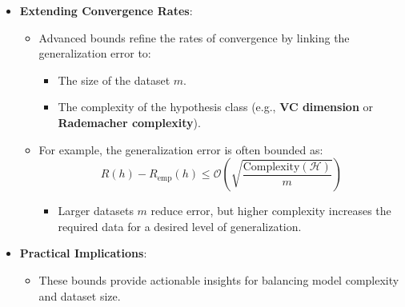 \documentclass[
  ignorenonframetext,
]{beamer}
\providecommand{\tightlist}{%
  \setlength{\itemsep}{0pt}\setlength{\parskip}{0pt}}\usepackage{longtable,booktabs,array}
\begin{document}
\begin{frame}
\begin{itemize}
\tightlist
\item
  \textbf{Extending Convergence Rates}:

  \begin{itemize}
  \tightlist
  \item
    Advanced bounds refine the rates of convergence by linking the
    generalization error to:

    \begin{itemize}
    \tightlist
    \item
      The size of the dataset \(m\).
    \item
      The complexity of the hypothesis class (e.g., \textbf{VC
      dimension} or \textbf{Rademacher complexity}).
    \end{itemize}
  \item
    For example, the generalization error is often bounded as: \[
    R(h) - R_{\text{emp}}(h) \leq \mathcal{O}\left(\sqrt{\frac{\text{Complexity}(\mathcal{H})}{m}}\right)
    \]

    \begin{itemize}
    \tightlist
    \item
      Larger datasets \(m\) reduce error, but higher complexity
      increases the required data for a desired level of generalization.
    \end{itemize}
  \end{itemize}
\item
  \textbf{Practical Implications}:

  \begin{itemize}
  \tightlist
  \item
    These bounds provide actionable insights for balancing model
    complexity and dataset size.
  \end{itemize}
\end{itemize}
\end{frame}
\end{document}
